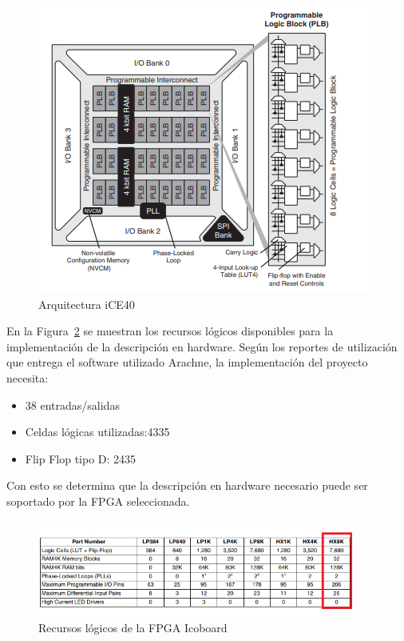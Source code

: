 \begin{figure}[H]
\includegraphics[scale=1.2]{Figs/architecture.PNG} 
\centering
\caption{Arquitectura iCE40~\citep{LatticeSemiconductor2017}}
\label{arquitectura}
\end{figure}

\noindent En la Figura~\ref{adecuacion2} se muestran los recursos lógicos disponibles para la implementación de la descripción en hardware.
Según los reportes de utilización que entrega el software utilizado Arachne, la implementación del proyecto necesita:
\begin{itemize}
    \item 38 entradas/salidas
    \item Celdas lógicas utilizadas:4335
    \item Flip Flop tipo D: 2435
\end{itemize}
Con esto se determina que la descripción en hardware necesario puede ser soportado por la FPGA seleccionada.

\begin{figure}[H]
\includegraphics[width=0.93\textwidth]{Figs/tabla.png} 
\centering
\caption{Recursos lógicos de la FPGA Icoboard~\citep{LatticeSemiconductor2017}}
\label{adecuacion2}
\end{figure}


